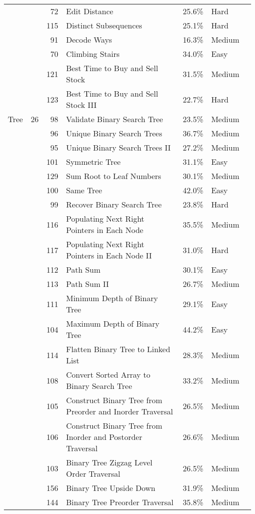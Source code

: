 \documentclass[9pt,b5paper]{article}
\begin{document}
\begin{center}
\begin{tabular}{lrrllll}
 &  & 72 & Edit Distance & 25.6\% & Hard & \\
 &  & 115 & Distinct Subsequences & 25.1\% & Hard & \\
 &  & 91 & Decode Ways & 16.3\% & Medium & \\
 &  & 70 & Climbing Stairs & 34.0\% & Easy & \\
 &  & 121 & Best Time to Buy and Sell Stock & 31.5\% & Medium & \\
 &  & 123 & Best Time to Buy and Sell Stock III & 22.7\% & Hard & \\
\hline
Tree & 26 & 98 & Validate Binary Search Tree & 23.5\% & Medium & \\
 &  & 96 & Unique Binary Search Trees & 36.7\% & Medium & \\
 &  & 95 & Unique Binary Search Trees II & 27.2\% & Medium & \\
 &  & 101 & Symmetric Tree & 31.1\% & Easy & \\
 &  & 129 & Sum Root to Leaf Numbers & 30.1\% & Medium & \\
 &  & 100 & Same Tree & 42.0\% & Easy & \\
 &  & 99 & Recover Binary Search Tree & 23.8\% & Hard & \\
 &  & 116 & Populating Next Right Pointers in Each Node & 35.5\% & Medium & \\
 &  & 117 & Populating Next Right Pointers in Each Node II & 31.0\% & Hard & \\
 &  & 112 & Path Sum & 30.1\% & Easy & \\
 &  & 113 & Path Sum II & 26.7\% & Medium & \\
 &  & 111 & Minimum Depth of Binary Tree & 29.1\% & Easy & \\
 &  & 104 & Maximum Depth of Binary Tree & 44.2\% & Easy & \\
 &  & 114 & Flatten Binary Tree to Linked List & 28.3\% & Medium & \\
 &  & 108 & Convert Sorted Array to Binary Search Tree & 33.2\% & Medium & \\
 &  & 105 & Construct Binary Tree from Preorder and Inorder Traversal & 26.5\% & Medium & \\
 &  & 106 & Construct Binary Tree from Inorder and Postorder Traversal & 26.6\% & Medium & \\
 &  & 103 & Binary Tree Zigzag Level Order Traversal & 26.5\% & Medium & \\
 &  & 156 & Binary Tree Upside Down & 31.9\% & Medium & \\
 &  & 144 & Binary Tree Preorder Traversal & 35.8\% & Medium & \\

\end{tabular}
\end{center}
\end{document}
